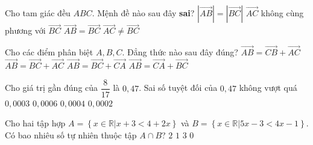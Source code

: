 \begin{ex}%
	Cho tam giác đều $ABC$. Mệnh đề nào sau đây \textbf{sai}?
	\choice
	{$\left|\overrightarrow{AB}\right|=\left|\overrightarrow{BC}\right|$}
	{$\overrightarrow{AC}$ không cùng phương với $\overrightarrow{BC}$}
	{\True $\overrightarrow{AB}=\overrightarrow{BC}$}
	{$\overrightarrow{AC} \neq \overrightarrow{BC}$}
\end{ex}
\begin{ex}%
	Cho các điểm phân biệt $A,B,C$. Đẳng thức nào sau đây đúng?
	\choice
	{\True $\overrightarrow{AB}=\overrightarrow{CB}+\overrightarrow{AC}$}
	{$\overrightarrow{AB}=\overrightarrow{BC}+\overrightarrow{AC}$}
	{$\overrightarrow{AB}=\overrightarrow{BC}+\overrightarrow{CA}$}
	{$\overrightarrow{AB}=\overrightarrow{CA}+\overrightarrow{BC}$}
\end{ex}
\begin{ex}%
	Cho giá trị gần đúng của $\dfrac{8}{17}$ là $0{,}47$. Sai số tuyệt đối của $0,47$ không vượt quá
	\choice
	{$0{,}0003$}
	{\True $0{,}0006$}
	{$0{,}0004$}
	{$0{,}0002$}
\end{ex}
\begin{ex}%
	Cho hai tập hợp $A=\left\{x\in \mathbb{R}|x+3<4+2x\right\}$ và $B=\left\{x\in \mathbb{R}|5x-3<4x-1\right\}$. Có bao nhiêu số tự nhiên thuộc tập $A\cap B$?
	\choice
	{\True $2$}
	{$1$}
	{$3$}
	{$0$}
\end{ex}
